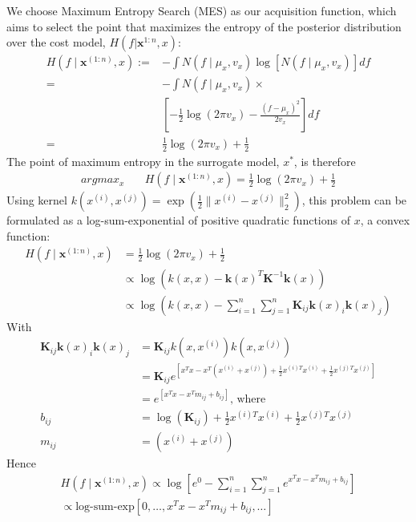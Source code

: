 \documentclass[10pt,twocolumn,letterpaper]{article}
\begin{document}
We choose Maximum Entropy Search (MES) as our acquisition function, which aims to select the point that maximizes the entropy of the posterior distribution over the cost model, $H(f | \textbf{x}^{1:n}, x)$:
\begin{align*}
    H(f \mid \textbf{x}^{(1:n)}, x) :=& -\int N(f \mid \mu_x, v_x) \log\left[N(f \mid \mu_x, v_x)\right]df\\
    =& -\int N(f \mid \mu_x, v_x) \times \\
    & \left[-\frac{1}{2}\log(2\pi v_x) - \frac{(f - \mu_x)^2}{2v_x}\right]df\\
    =& \frac{1}{2}\log(2\pi v_x) + \frac{1}{2}
\end{align*}
The point of maximum entropy in the surrogate model, $x^*$, is therefore
\begin{align*}
    argmax_x \quad & H(f \mid \textbf{x}^{(1:n)}, x) = \frac{1}{2}\log(2\pi v_x) + \frac{1}{2}
\end{align*}
Using kernel $k(x^{(i)}, x^{(j)}) = \exp\left(\frac{1}{2}\lVert x^{(i)} - x^{(j)}\rVert^2_2\right)$, this problem can be formulated as a log-sum-exponential of positive quadratic functions of $x$, a convex function:
\begin{align*}
    H(f \mid \textbf{x}^{(1:n)}, x) &= \frac{1}{2}\log(2\pi v_x) + \frac{1}{2}\\
    &\propto \log(k(x, x) - \textbf{k}(x)^T\textbf{K}^{-1}\textbf{k}(x))\\
    &\propto \log(k(x, x) - \sum_{i=1}^n\sum_{j=1}^n \textbf{K}_{ij} \textbf{k}(x)_i \textbf{k}(x)_j)
\end{align*}
With 
\begin{align*}
    \textbf{K}_{ij} \textbf{k}(x)_i \textbf{k}(x)_j &= \textbf{K}_{ij}k(x, x^{(i)})k(x, x^{(j)})\\
    &= \textbf{K}_{ij}e^{\left[x^Tx - x^T\left(x^{(i)} + x^{(j)}\right) + \frac{1}{2}x^{(i)T}x^{(i)} + \frac{1}{2}x^{(j)T}x^{(j)} \right]}\\
    &= e^{\left[x^Tx - x^Tm_{ij} + b_{ij}\right]} \textrm{, where}\\
    b_{ij} &= \log(\textbf{K}_{ij}) + \frac{1}{2}x^{(i)T}x^{(i)} + \frac{1}{2}x^{(j)T}x^{(j)}\\
    m_{ij} &= (x^{(i)} + x^{(j)})
\end{align*}
Hence
\begin{align*}
    H(f \mid \textbf{x}^{(1:n)}, x) \propto \log\left[ e^0 - \sum_{i=1}^n\sum_{j=1}^n e^{x^Tx - x^Tm_{ij} + b_{ij}} \right]\\
    \propto \textrm{log-sum-exp}\left[0, \dots, x^Tx - x^Tm_{ij} + b_{ij}, \dots\right]
\end{align*}
\end{document}
